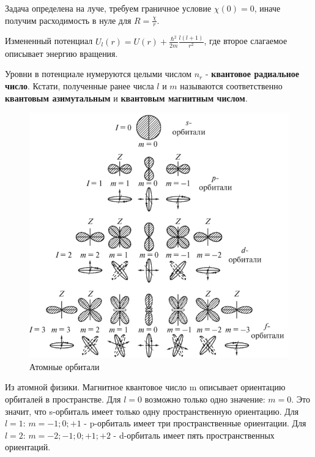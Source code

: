 \par Задача определена на луче, требуем граничное условие $\chi(0) = 0 $, иначе получим расходимость в нуле для $R = \frac{\chi}{r}$.
\par Измененный потенциал $U_l (r) = U(r) + \frac{\hbar^2}{2m} \frac{l(l+1)}{r^2}$, где второе слагаемое описывает энергию вращения.
\par Уровни в потенциале нумеруются целыми числом $n_r$ - \textbf{квантовое радиальное число}. Кстати, полученные ранее числа $l$ и $m$ называются соответственно \textbf{квантовым азимутальным} и \textbf{квантовым магнитным числом}.
\par \begin{figure} 
\vspace{-2ex}
\centering
\includegraphics[width=1\linewidth]{pictures/27.2.png}
\caption{Атомные орбитали}
\end{figure}
\par Из атомной физики. Магнитное квантовое число m описывает ориентацию орбиталей в пространстве.
Для $l=0$ возможно только одно значение: $m=0$. Это значит, что s-орбиталь имеет только одну пространственную ориентацию.
Для $l=1$: $m=-1;0;+1$ - p-орбиталь имеет три пространственные ориентации.
Для $l=2$: $m=-2;-1;0;+1;+2$ - d-орбиталь имеет пять пространственных ориентаций.

